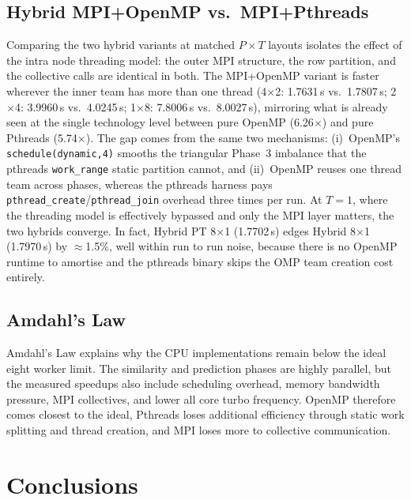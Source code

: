 \documentclass[11pt,a4paper]{article}
\newcommand{\code}[1]{\texttt{\small #1}}
\begin{document}
\subsection{Hybrid MPI+OpenMP vs.\ MPI+Pthreads}

Comparing the two hybrid variants at matched $P\times T$ layouts isolates the
effect of the intra node threading model: the outer MPI structure, the row
partition, and the collective calls are identical in both. The MPI+OpenMP
variant is faster wherever the inner team has more than one thread
(4$\times$2: 1.7631\,s vs.\ 1.7807\,s; 2$\times$4: 3.9960\,s vs.\ 4.0245\,s;
1$\times$8: 7.8006\,s vs.\ 8.0027\,s), mirroring what is already seen at the
single technology level between pure OpenMP (6.26$\times$) and pure Pthreads
(5.74$\times$). The gap comes from the same two mechanisms: (i)~OpenMP's
\code{schedule(dynamic,4)} smooths the triangular Phase~3 imbalance that the
pthreads \code{work\_range} static partition cannot, and (ii)~OpenMP reuses
one thread team across phases, whereas the pthreads harness pays
\code{pthread\_create}/\code{pthread\_join} overhead three times per run. At
$T{=}1$, where the threading model is effectively bypassed and only the MPI
layer matters, the two hybrids converge. In fact, Hybrid PT 8$\times$1
(1.7702\,s) edges Hybrid 8$\times$1 (1.7970\,s) by $\approx$1.5\%, well within
run to run noise, because there is no OpenMP runtime to amortise and the
pthreads binary skips the OMP team creation cost entirely.

\subsection{Amdahl's Law}\label{sec:amdahl}

Amdahl's Law explains why the CPU implementations remain below the ideal
eight worker limit. The similarity and prediction phases are highly parallel,
but the measured speedups also include scheduling overhead, memory bandwidth
pressure, MPI collectives, and lower all core turbo frequency. OpenMP therefore
comes closest to the ideal, Pthreads loses additional efficiency through static
work splitting and thread creation, and MPI loses more to collective
communication.

\section{Conclusions}\label{sec:conclusions}
\end{document}
